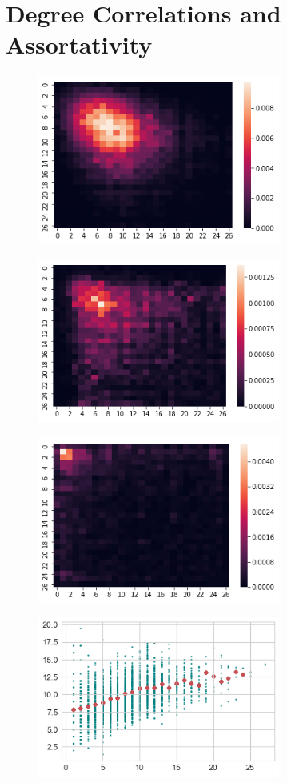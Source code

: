 \section{Degree Correlations and Assortativity}

\begin{figure}[h]
\includegraphics[width=8cm]{img/heatmap_0}
\end{figure}

\begin{figure}[h]
\includegraphics[width=8cm]{img/heatmap_1}
\end{figure}

\begin{figure}[h]
\includegraphics[width=8cm]{img/heatmap_2}
\end{figure}



\begin{figure}[h]
\includegraphics[width=8cm]{img/scatter_0}
\end{figure}


